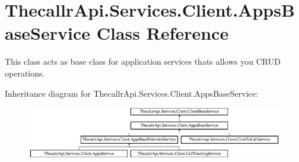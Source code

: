 \hypertarget{class_thecallr_api_1_1_services_1_1_client_1_1_apps_base_service}{\section{Thecallr\+Api.\+Services.\+Client.\+Apps\+Base\+Service Class Reference}
\label{class_thecallr_api_1_1_services_1_1_client_1_1_apps_base_service}
}


This class acts as base class for application services thats allows you C\+R\+U\+D operations.  


Inheritance diagram for Thecallr\+Api.\+Services.\+Client.\+Apps\+Base\+Service\+:\begin{figure}[H]
\begin{center}
\leavevmode
\includegraphics[height=2.248996cm]{class_thecallr_api_1_1_services_1_1_client_1_1_apps_base_service}
\end{center}
\end{figure}
